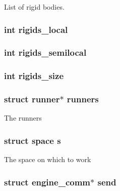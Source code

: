 List of rigid bodies. \hypertarget{structengine_a7f84bbfd25fea51dd4e013d3a37852bc}{
\subsubsection[{rigids\-\_\-local}]{\setlength{\rightskip}{0pt plus 5cm}int rigids\-\_\-local}}\label{structengine_a7f84bbfd25fea51dd4e013d3a37852bc}
\hypertarget{structengine_a479a52cfdd56b4ea6b5787215382ba98}{
\subsubsection[{rigids\-\_\-semilocal}]{\setlength{\rightskip}{0pt plus 5cm}int rigids\-\_\-semilocal}}\label{structengine_a479a52cfdd56b4ea6b5787215382ba98}
\hypertarget{structengine_ae5cb986dfb738c34c591a315301fd893}{
\subsubsection[{rigids\-\_\-size}]{\setlength{\rightskip}{0pt plus 5cm}int rigids\-\_\-size}}\label{structengine_ae5cb986dfb738c34c591a315301fd893}
\hypertarget{structengine_a148249829cb5f9708393abbb5a339d78}{
\subsubsection[{runners}]{\setlength{\rightskip}{0pt plus 5cm}struct {\bf runner}$\ast$ runners}}\label{structengine_a148249829cb5f9708393abbb5a339d78}
The runners \hypertarget{structengine_afbf1b94acbdcbdcd57558b82d9cc649f}{
\subsubsection[{s}]{\setlength{\rightskip}{0pt plus 5cm}struct {\bf space} s}}\label{structengine_afbf1b94acbdcbdcd57558b82d9cc649f}
The space on which to work \hypertarget{structengine_a96cd0f48e5460fa6a5ee9f646a6cc667}{
\subsubsection[{send}]{\setlength{\rightskip}{0pt plus 5cm}struct {\bf engine\-\_\-comm}$\ast$ send}}\label{structengine_a96cd0f48e5460fa6a5ee9f646a6cc667}
